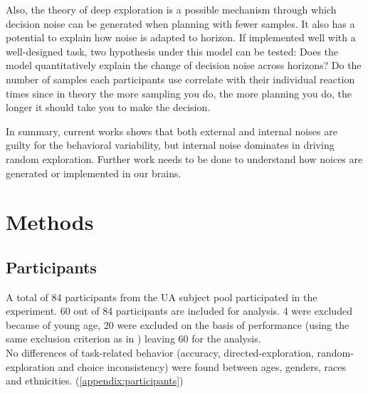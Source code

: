 \documentclass[12pt]{article}
\begin{document}
	Also, the theory of deep exploration is a possible mechanism through which decision noise can be generated when planning with fewer samples. It also has a potential to explain how noise is adapted to horizon. If implemented well with a well-designed task, two hypothesis under this model can be tested: Does the model quantitatively explain the change of decision noise across horizons? Do the number of samples each participants use correlate with their individual reaction times since in theory the more sampling you do, the more planning you do, the longer it should take you to make the decision.
	
	In summary, current works shows that both external and internal noises are guilty for the behavioral variability, but internal noise dominates in driving random exploration. Further work needs to be done to understand how noices are generated or implemented in our brains.      
	
	
	\section*{Methods}
	\subsection*{Participants}
	
	A total of 84 participants from the UA subject pool participated in the experiment. 60 out of 84 participants are included for analysis. 4 were excluded because of young age, 20 were excluded on the basis of performance (using the same exclusion criterion as in \citep{wilson2014}) leaving 60 for the analysis.\\
	
	No differences of task-related behavior (accuracy, directed-exploration, random-exploration and choice inconsistency) were found between ages, genders, races and ethnicities. (\ref{appendix:participants})
	
	
	
\end{document}
